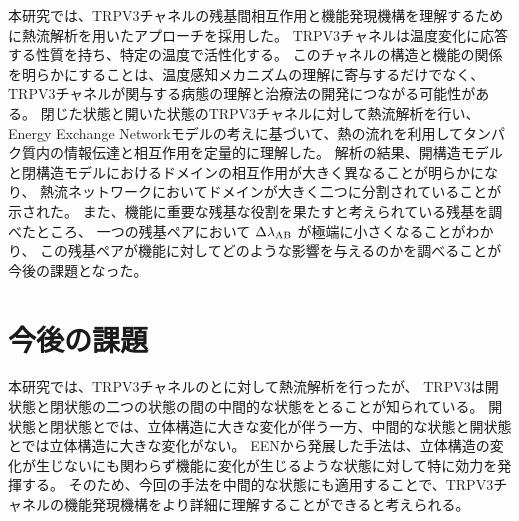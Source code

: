 本研究では、TRPV3チャネルの残基間相互作用と機能発現機構を理解するために熱流解析を用いたアプローチを採用した。
TRPV3チャネルは温度変化に応答する性質を持ち、特定の温度で活性化する。
このチャネルの構造と機能の関係を明らかにすることは、温度感知メカニズムの理解に寄与するだけでなく、
TRPV3チャネルが関与する病態の理解と治療法の開発につながる可能性がある。
閉じた状態と開いた状態のTRPV3チャネルに対して熱流解析を行い、
Energy Exchange Networkモデルの考えに基づいて、熱の流れを利用してタンパク質内の情報伝達と相互作用を定量的に理解した。
解析の結果、開構造モデルと閉構造モデルにおけるドメインの相互作用が大きく異なることが明らかになり、
熱流ネットワークにおいてドメインが大きく二つに分割されていることが示された。
また、機能に重要な残基な役割を果たすと考えられている残基を調べたところ、
一つの残基ペアにおいて $\Delta \lambda_{\rm{AB}}$ が極端に小さくなることがわかり、
この残基ペアが機能に対してどのような影響を与えるのかを調べることが今後の課題となった。

\section{今後の課題}

本研究では、TRPV3チャネルの\openFortyTwo と\closeFortyTwo に対して熱流解析を行ったが、
TRPV3は開状態と閉状態の二つの状態の間の中間的な状態をとることが知られている。
開状態と閉状態とでは、立体構造に大きな変化が伴う一方、中間的な状態と開状態とでは立体構造に大きな変化がない。
EENから発展した手法は、立体構造の変化が生じないにも関わらず機能に変化が生じるような状態に対して特に効力を発揮する。
そのため、今回の手法を中間的な状態にも適用することで、TRPV3チャネルの機能発現機構をより詳細に理解することができると考えられる。
